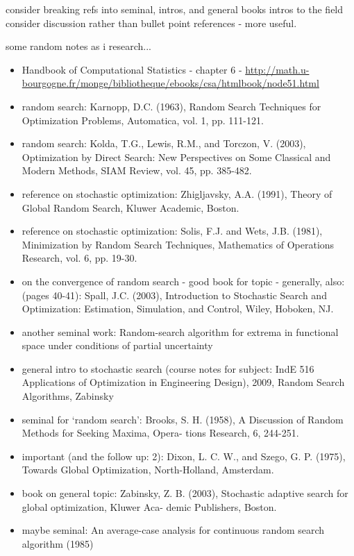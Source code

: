 \documentclass[a4paper, 11pt]{article}
\begin{document}
consider breaking refs into seminal, intros, and general books intros to the field
consider discussion rather than bullet point references - more useful.

some random notes as i research...
\begin{itemize}
	\item Handbook of Computational Statistics - chapter 6 - \url{http://math.u-bourgogne.fr/monge/bibliotheque/ebooks/csa/htmlbook/node51.html}
	\item random search: Karnopp, D.C. (1963), Random Search Techniques for Optimization Problems, Automatica, vol. 1, pp. 111-121.
	\item random search: Kolda, T.G., Lewis, R.M., and Torczon, V. (2003), Optimization by Direct Search: New Perspectives on Some Classical and Modern Methods, SIAM Review, vol. 45, pp. 385-482.
	\item reference on stochastic optimization: Zhigljavsky, A.A. (1991), Theory of Global Random Search, Kluwer Academic, Boston.
	\item reference on stochastic optimization: Solis, F.J. and Wets, J.B. (1981), Minimization by Random Search Techniques, Mathematics of Operations Research, vol. 6, pp. 19-30.
	\item on the convergence of random search - good book for topic - generally, also: (pages 40-41): Spall, J.C. (2003), Introduction to Stochastic Search and Optimization: Estimation, Simulation, and Control, Wiley, Hoboken, NJ.
	\item another seminal work: Random-search algorithm for extrema in functional space under conditions of partial uncertainty
	\item general intro to stochastic search (course notes for subject: IndE 516 Applications of Optimization in Engineering Design), 2009, Random Search Algorithms, Zabinsky
	\item seminal for `random search': Brooks, S. H. (1958), A Discussion of Random Methods for Seeking Maxima, Opera- tions Research, 6, 244-251.
	\item important (and the follow up: 2): Dixon, L. C. W., and Szego, G. P. (1975), Towards Global Optimization, North-Holland, Amsterdam.
	\item book on general topic: Zabinsky, Z. B. (2003), Stochastic adaptive search for global optimization, Kluwer Aca- demic Publishers, Boston.
	\item maybe seminal: An average-case analysis for continuous random search algorithm (1985)
	
\end{itemize}
\end{document}
